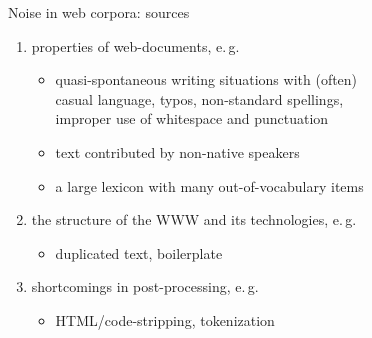 \begin{frame}
  {Noise in web corpora: sources}

  \begin{enumerate}
 \item <1-> properties of web-documents, e.\,g.
    \begin{itemize}
    \item quasi-spontaneous writing situations with (often)\\
      casual language, typos, non-standard spellings,\\
      improper use of whitespace and punctuation
    \item text contributed by non-native speakers 
    \item a large lexicon with many out-of-vocabulary items
   \end{itemize}
  \item<2-> the structure of the WWW and its technologies, e.\,g.
    \begin{itemize}
    \item duplicated text, boilerplate
    \end{itemize}
  \item<2-> shortcomings in post-processing, e.\,g.
    \begin{itemize}
    \item HTML/code-stripping, tokenization 
    \end{itemize}
  \end{enumerate}
\end{frame}



  
